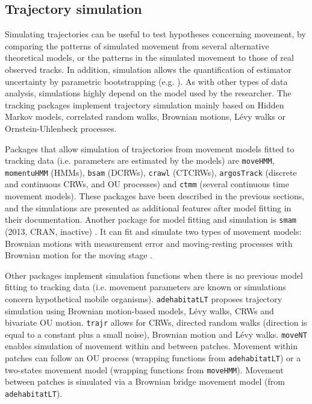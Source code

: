 \documentclass[a4paper,12pt]{article}
\newcommand{\Rpkg}[1]{\texttt{#1}}
\begin{document}
	\subsection*{Trajectory simulation} 
	
	Simulating trajectories can be useful to test hypotheses concerning movement, by comparing the patterns of simulated movement from several alternative theoretical models, or the patterns in the simulated movement to those of real observed tracks. In addition, simulation allows the quantification of estimator uncertainty by parametric bootstrapping (e.g. \cite{Michelot2016}). As with other types of data analysis, simulations highly depend on the model used by the researcher. 
	The tracking packages implement trajectory simulation mainly based on Hidden Markov models, correlated random walks, Brownian motions, L\'evy walks or Ornstein-Uhlenbeck processes. %
	
	Packages that allow simulation of trajectories from movement models fitted to tracking data (i.e. parameters are estimated by the models) are \Rpkg{moveHMM}, \Rpkg{momentuHMM} (HMMs), \Rpkg{bsam} (DCRWs), \Rpkg{crawl} (CTCRWs), \Rpkg{argosTrack} (discrete and continuous CRWs, and OU processes) and \Rpkg{ctmm} (several continuous time movement models). These packages have been described in the previous sections, and the simulations are presented as additional features after model fitting in their documentation. Another package for model fitting and simulation is \Rpkg{smam} (2013, CRAN, inactive) \citep{Pozdnyakov2018,Pozdnyakov2014,Pozdnyakov2017,Yan2014,Rsmam}. It can fit and simulate two types of movement models: Brownian motions with measurement error \citep{Pozdnyakov2014} and moving-resting processes with Brownian motion for the moving stage \citep{Yan2014}.
	
	Other packages implement simulation functions when there is no previous model fitting to tracking data (i.e. movement parameters are known or simulations concern hypothetical mobile organisms). \Rpkg{adehabitatLT} proposes trajectory simulation using Brownian motion-based models, L\'evy walks, CRWs and bivariate OU motion. \Rpkg{trajr} allows for CRWs, directed random walks (direction is equal to a constant plus a small noise), Brownian motion and L\'evy walks. \Rpkg{moveNT} enables simulation of movement within and between patches. Movement within patches can follow an OU process (wrapping functions from \Rpkg{adehabitatLT}) or a two-states movement model (wrapping functions from \Rpkg{moveHMM}). Movement between patches is simulated via a Brownian bridge movement model (from \Rpkg{adehabitatLT}). 
	
\end{document}
